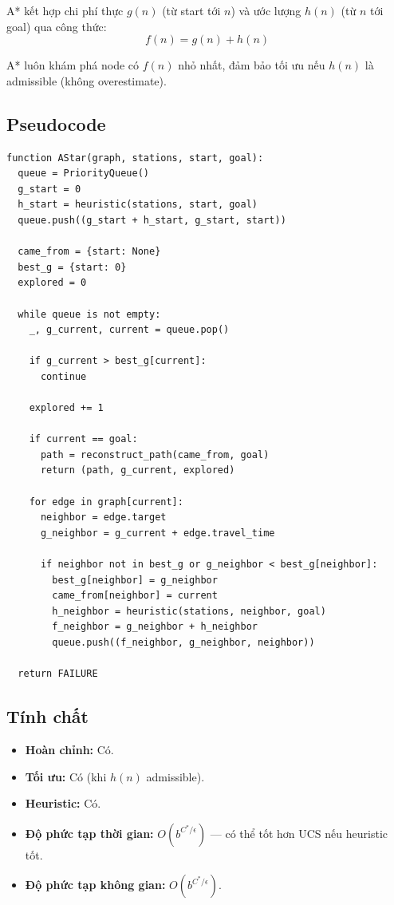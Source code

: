 A* kết hợp chi phí thực $g(n)$ (từ start tới $n$) và ước lượng $h(n)$ (từ $n$ tới goal) qua công thức:
\[
  f(n) = g(n) + h(n)
\]

A* luôn khám phá node có $f(n)$ nhỏ nhất, đảm bảo tối ưu nếu $h(n)$ là admissible (không overestimate).

\subsection{Pseudocode}

\begin{lstlisting}[caption=A* Algorithm Pseudocode]
function AStar(graph, stations, start, goal):
  queue = PriorityQueue()
  g_start = 0
  h_start = heuristic(stations, start, goal)
  queue.push((g_start + h_start, g_start, start))

  came_from = {start: None}
  best_g = {start: 0}
  explored = 0

  while queue is not empty:
    _, g_current, current = queue.pop()

    if g_current > best_g[current]:
      continue

    explored += 1

    if current == goal:
      path = reconstruct_path(came_from, goal)
      return (path, g_current, explored)

    for edge in graph[current]:
      neighbor = edge.target
      g_neighbor = g_current + edge.travel_time

      if neighbor not in best_g or g_neighbor < best_g[neighbor]:
        best_g[neighbor] = g_neighbor
        came_from[neighbor] = current
        h_neighbor = heuristic(stations, neighbor, goal)
        f_neighbor = g_neighbor + h_neighbor
        queue.push((f_neighbor, g_neighbor, neighbor))

  return FAILURE
\end{lstlisting}

\subsection{Tính chất}

\begin{itemize}
  \item \textbf{Hoàn chỉnh:} Có.
  \item \textbf{Tối ưu:} Có (khi $h(n)$ admissible).
  \item \textbf{Heuristic:} Có.
  \item \textbf{Độ phức tạp thời gian:} $O(b^{C^*/\epsilon})$ --- có thể tốt hơn UCS nếu heuristic tốt.
  \item \textbf{Độ phức tạp không gian:} $O(b^{C^*/\epsilon})$.
\end{itemize}

